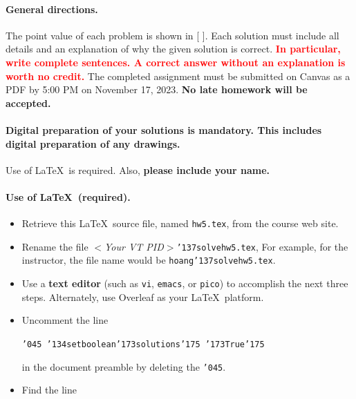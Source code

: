 \documentclass[11pt,twoside]{article}
\newcommand{\mybackslash}{\char'134}
\newcommand{\myleftbracket}{\char'173}
\newcommand{\myrightbracket}{\char'175}
\newcommand{\mypercent}{\char'045}
\newcommand{\myunderscore}{\char'137}
\newcommand{\duedate}{November 17, 2023}
\newcommand{\homeworknumber}{5}
\newcounter{problem}
\begin{document}
{
\begingroup %
\paragraph{General directions.}
The point value of each problem is shown in [ ].
Each solution must include all details and
an explanation of why the given solution is correct.
\textbf{\textcolor{red}{In particular,
write complete sentences.
A correct answer without an explanation is worth no credit.}}
The completed assignment must be submitted on Canvas as a PDF by 5:00 PM
on \duedate.
\textbf{No late homework will be accepted.}

\paragraph{Digital preparation of your solutions is mandatory.
This includes digital preparation of any drawings.}
Use of \LaTeX\ is required.
Also,
\textbf{please include your name.}

\paragraph{Use of \LaTeX\ (required).}
\begin{itemize}
\item Retrieve this \LaTeX\ source file,
named
\texttt{hw\homeworknumber.tex},
from the course web site.
\item Rename the file
\textit{$<$Your VT PID$>$}\texttt{{\myunderscore}solvehw\homeworknumber.tex},
For example,
for the instructor,
the file name would be
\texttt{hoang{\myunderscore}solvehw\homeworknumber.tex}.

\item
Use a \textbf{text editor}
(such as \texttt{vi}, \texttt{emacs}, or \texttt{pico})
to accomplish the next three steps.
Alternately,
use Overleaf as your \LaTeX\ platform.

\item
Uncomment the line

\texttt{{\mypercent} 
{\mybackslash}setboolean{\myleftbracket}solutions{\myrightbracket}%
{\myleftbracket}True{\myrightbracket}}

in the document preamble by deleting the \texttt{\mypercent}.

\item
Find the line


\end{itemize}}
\end{document}
